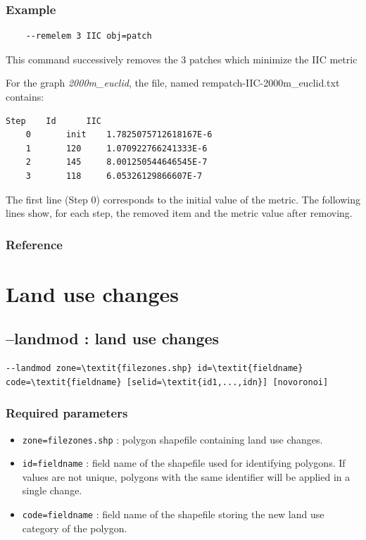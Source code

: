 \documentclass[a4paper,10pt]{report}
\begin{document}
\subsubsection{Example}

\begin{Verbatim}
	--remelem 3 IIC obj=patch
\end{Verbatim}
This command  successively removes the 3 patches which minimize the IIC metric

For the graph \textit{2000m\_euclid}, the file, named rempatch-IIC-2000m\_euclid.txt contains:
\begin{Verbatim}[tabsize=4]
	Step	Id  	IIC
	0   	init	1.7825075712618167E-6
	1   	120 	1.070922766241333E-6
	2   	145 	8.001250544646545E-7
	3   	118 	6.05326129866607E-7
\end{Verbatim}
The first line (Step 0) corresponds to the initial value of the metric. The following lines show, for each step, the removed item and the metric value after removing.

\subsubsection{Reference}
\cite{2016_campagnole}


\section{Land use changes}
\subsection{--landmod : land use changes}

\begin{Verbatim}[commandchars=\\\{\}]
--landmod zone=\textit{filezones.shp} id=\textit{fieldname} code=\textit{fieldname} [selid=\textit{id1,...,idn}] [novoronoi]
\end{Verbatim}

\subsubsection{Required parameters}
\begin{itemize}
	\item \verb|zone=filezones.shp| : polygon shapefile containing land use changes.
	\item \verb|id=fieldname| : field name of the shapefile used for identifying polygons. If values are not unique, polygons with the same identifier will be applied in a single change.
	\item \verb|code=fieldname| : field name of the shapefile storing the new land use category of the polygon.
\end{itemize}
\end{document}
